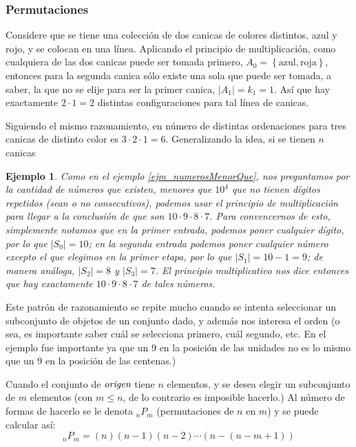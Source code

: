 \documentclass[spanish]{report}
\newtheorem{ejm}[thm]{Ejemplo}
\newcommand{\card}[1]{\left|#1 \right|}
\newcommand{\perm}[2]{ {}_{#1}P_{#2}}
\begin{document}
\subsubsection{Permutaciones}
Considere que se tiene una colección de dos canicas de colores distintos, azul y rojo, y se colocan en una línea.
Aplicando el principio de multiplicación, como cualquiera de las dos canicas puede ser tomada primero, $A_0 = \left\lbrace \text{azul}, \text{roja} \right\rbrace$, entonces para la segunda canica sólo existe una sola que puede ser tomada, a saber, la que no se elije para ser la primer canica, $\card{A_1} = k_1 = 1$. Así que hay exactamente $2 \cdotp 1 = 2$ distintas configuraciones para tal línea de canicas.

Siguiendo el mismo razonamiento, en número de distintas ordenaciones para tres canicas de distinto color es $3 \cdotp 2 \cdotp 1= 6$.
Generalizando la idea, si se tienen $n$ canicas 

\begin{ejm}
Como en el ejemplo \ref{ejm_numerosMenorQue}, nos preguntamos por la cantidad de números que existen, menores que $10^4$ que no tienen dígitos repetidos (sean o no consecutivos), podemos usar el principio de multiplicación para llegar a la conclusión	de que son $10 \cdotp 9 \cdotp 8 \cdotp 7$. Para convencernos de esto, simplemente notamos que en la primer entrada, podemos poner cualquier dígito, por lo que $\card{S_0} = 10$; en la segunda entrada podemos poner cualquier número excepto el que elegimos en la primer etapa, por lo que $\card{S_1} = 10 - 1 = 9$; de manera análoga, $\card{S_2} = 8$ y $\card{S_3} = 7$.
El principio multiplicativo nos dice entonces que hay exactamente $10 \cdotp 9 \cdotp 8 \cdotp 7$ de tales números.
\end{ejm}

Este patrón de razonamiento se repite mucho cuando se intenta seleccionar un subconjunto de objetos de un conjunto dado, y además nos interesa el orden (o sea, es importante saber cuál se selecciona primero, cuál segundo, etc. En el ejemplo fue importante ya que un 9 en la posición de las unidades no es lo mismo que un 9 en la posición de las centenas.)

Cuando el conjunto de $\emph{origen}$ tiene $n$ elementos, y se desea elegir un subconjunto de $m$ elementos (con $m \leq n$, de lo contrario es imposible hacerlo.)
Al número de formas de hacerlo se le denota $\perm{n}{m}$ (permutaciones de $n$ en $m$) y se puede calcular así:
\begin{equation} \label{eq_defPermutacion}
\perm{n}{m} = (n) (n-1) (n-2) \cdots (n-(n-m+1))
\end{equation}
\end{document}
